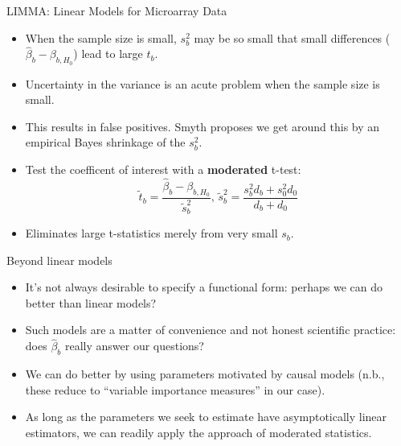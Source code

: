 \documentclass[12pt,t]{beamer}
\begin{document}
\begin{frame}[c]{LIMMA: Linear Models for Microarray Data}

\begin{center}
\begin{itemize}
  \itemsep12pt
  \item When the sample size is small, $s^2_b$ may be so small that small
    differences ($\hat{\beta}_{b} - \beta_{b, H_0}$) lead to large $t_{b}$.
  \item Uncertainty in the variance is an acute problem when the sample size is
    small.
  \item This results in false positives. Smyth proposes we get around this by an
    empirical Bayes shrinkage of the $s^2_b$.
  \item Test the coefficent of interest with a \textbf{moderated} t-test:
    \[
      \tilde{t}_{b} = \frac{\hat{\beta}_{b} - \beta_{b, H_0}}{\tilde{s}^2_b},
      \,
      \tilde{s}^2_b = \frac{s^2_bd_b + s^2_0d_0}{d_b + d_0}
    \]
  \item Eliminates large t-statistics merely from very small $s_b$.
\end{itemize}
\end{center}

\end{frame}



\begin{frame}[c]{Beyond linear models}

\begin{center}
\begin{itemize}
  \itemsep12pt
  \item It's not always desirable to specify a functional form: perhaps we can
    do better than linear models?
  \item Such models are a matter of convenience and not honest scientific
    practice: does $\hat{\beta}_{b}$ really answer our questions?
  \item We can do better by using parameters motivated by causal models (n.b.,
    these reduce to ``variable importance measures'' in our case).
  \item As long as the parameters we seek to estimate have asymptotically linear
    estimators, we can readily apply the approach of moderated statistics.
\end{itemize}
\end{center}

\end{frame}
\end{document}
